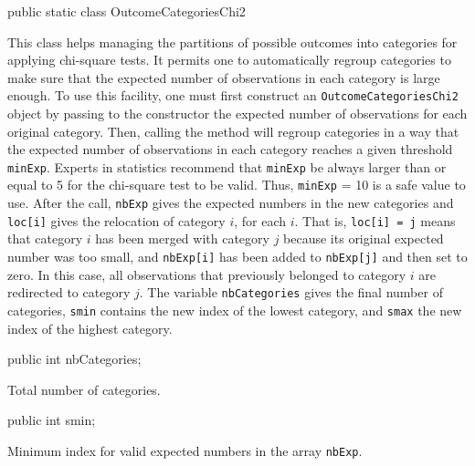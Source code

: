 \begin{code}

   public static class OutcomeCategoriesChi2\begin{hide} {\end{hide}
\end{code}
\begin{tabb}
This class helps managing the partitions of possible outcomes
into categories for applying chi-square tests.
It permits one to automatically regroup categories to make sure that
the expected number of observations in each category is large enough.
To use this facility, one must first construct an
\texttt{OutcomeCategoriesChi2} object by passing to the constructor
the expected number of observations for each original category.
Then, calling the method  will regroup
categories in a way that the expected number of observations in each
category reaches a given threshold \texttt{minExp}.
Experts in statistics recommend that \texttt{minExp} be always larger
than or equal to 5 for the chi-square test to be valid. Thus,
\texttt{minExp} = 10 is a safe value to use.
After the call, \texttt{nbExp} gives the expected numbers in the new
categories and \texttt{loc[i]} gives the relocation of category $i$,
for each $i$.  That is, \texttt{loc[i] = j} means that category $i$ has
been merged with category $j$ because its original expected number was
too small, and \texttt{nbExp[i]} has been added to \texttt{nbExp[j]}
and then set to zero.
In this case, all observations that previously belonged
to category $i$ are redirected to category $j$.
The variable \texttt{nbCategories} gives the final number of categories,
\texttt{smin} contains the new index of the lowest category,
and \texttt{smax} the new index of the highest category.
\end{tabb}
\begin{code}

      public int nbCategories;
\end{code}
\begin{tabbb} Total number of categories. \end{tabbb}
\begin{code}

      public int smin;
\end{code}
\begin{tabbb}   Minimum index for valid expected numbers
   in the array \texttt{nbExp}.
\end{tabbb}
